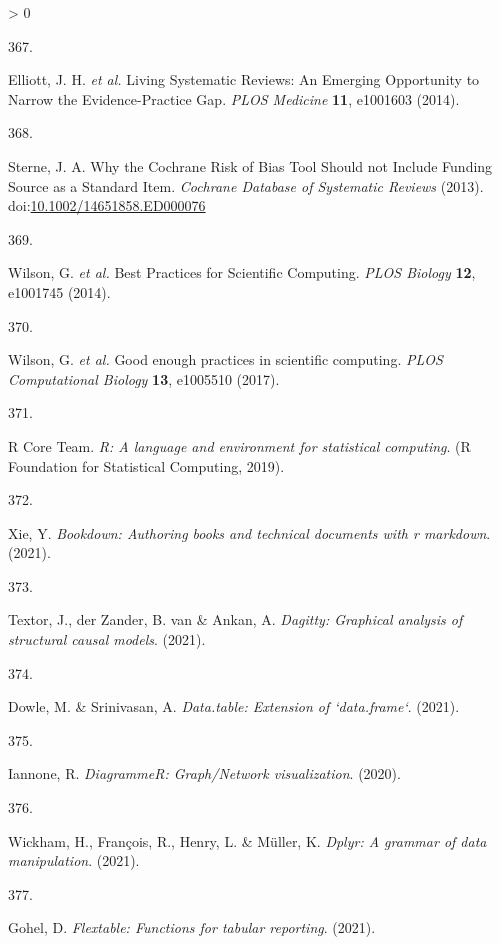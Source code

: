 \documentclass[a4paper, twoside]{templates/ociamthesis}
\newlength{\cslhangindent}
\newlength{\csllabelwidth}
\newenvironment{CSLReferences}[3] %
 {%
  \setlength{\parindent}{0pt}
  \ifodd #1 \everypar{\setlength{\hangindent}{\cslhangindent}}\ignorespaces\fi
  \ifnum #2 > 0
  \setlength{\parskip}{#2\baselineskip}
  \fi
 }%
 {}
\newcommand{\CSLLeftMargin}[1]{\parbox[t]{\maxof{\widthof{#1}}{\csllabelwidth}}{#1}}
\newcommand{\CSLRightInline}[1]{\parbox[t]{\linewidth - \csllabelwidth}{#1}}
\begin{document}
\begin{CSLReferences}{0}{0}
\leavevmode\hypertarget{ref-elliott2014}{}%
\CSLLeftMargin{367. }
\CSLRightInline{Elliott, J. H. \emph{et al.} Living {Systematic Reviews}: An {Emerging Opportunity} to {Narrow} the {Evidence}-{Practice Gap}. \emph{PLOS Medicine} \textbf{11}, e1001603 (2014).}

\leavevmode\hypertarget{ref-sterne2013}{}%
\CSLLeftMargin{368. }
\CSLRightInline{Sterne, J. A. Why the {Cochrane Risk} of {Bias Tool Should} not {Include Funding Source} as a {Standard Item}. \emph{Cochrane Database of Systematic Reviews} (2013). doi:\href{https://doi.org/10.1002/14651858.ED000076}{10.1002/14651858.ED000076}}

\leavevmode\hypertarget{ref-wilson2014}{}%
\CSLLeftMargin{369. }
\CSLRightInline{Wilson, G. \emph{et al.} Best {Practices} for {Scientific Computing}. \emph{PLOS Biology} \textbf{12}, e1001745 (2014).}

\leavevmode\hypertarget{ref-wilson2017}{}%
\CSLLeftMargin{370. }
\CSLRightInline{Wilson, G. \emph{et al.} Good enough practices in scientific computing. \emph{PLOS Computational Biology} \textbf{13}, e1005510 (2017).}

\leavevmode\hypertarget{ref-R-base}{}%
\CSLLeftMargin{371. }
\CSLRightInline{R Core Team. \emph{R: A language and environment for statistical computing}. ({R Foundation for Statistical Computing}, 2019).}

\leavevmode\hypertarget{ref-R-bookdown}{}%
\CSLLeftMargin{372. }
\CSLRightInline{Xie, Y. \emph{Bookdown: Authoring books and technical documents with r markdown}. (2021).}

\leavevmode\hypertarget{ref-R-dagitty}{}%
\CSLLeftMargin{373. }
\CSLRightInline{Textor, J., der Zander, B. van \& Ankan, A. \emph{Dagitty: Graphical analysis of structural causal models}. (2021).}

\leavevmode\hypertarget{ref-R-data.table}{}%
\CSLLeftMargin{374. }
\CSLRightInline{Dowle, M. \& Srinivasan, A. \emph{Data.table: Extension of `data.frame`}. (2021).}

\leavevmode\hypertarget{ref-R-DiagrammeR}{}%
\CSLLeftMargin{375. }
\CSLRightInline{Iannone, R. \emph{{DiagrammeR}: Graph/{Network} visualization}. (2020).}

\leavevmode\hypertarget{ref-R-dplyr}{}%
\CSLLeftMargin{376. }
\CSLRightInline{Wickham, H., François, R., Henry, L. \& Müller, K. \emph{Dplyr: A grammar of data manipulation}. (2021).}

\leavevmode\hypertarget{ref-R-flextable}{}%
\CSLLeftMargin{377. }
\CSLRightInline{Gohel, D. \emph{Flextable: Functions for tabular reporting}. (2021).}


\end{CSLReferences}
\end{document}
